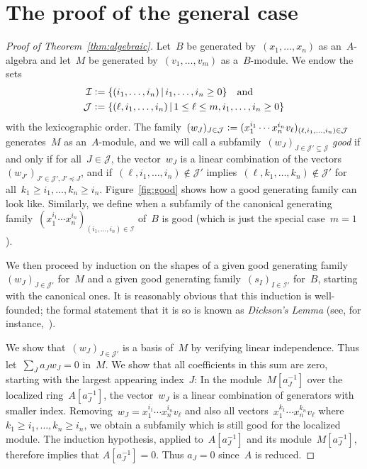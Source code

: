 \documentclass[oneside]{amsart}
\theoremstyle{definition}
\theoremstyle{plain}
\theoremstyle{remark}
\newcommand{\I}{\mathcal{I}}
\newcommand{\J}{\mathcal{J}}
\newcommand{\defeq}{\vcentcolon=}
\begin{document}
\section{The proof of the general case}

\begin{proof}[Proof of Theorem~\ref{thm:algebraic}]
Let~$B$ be generated by~$(x_1,\ldots,x_n)$ as an~$A$-algebra and
let~$M$ be generated by~$(v_1,\ldots,v_m)$ as a~$B$-module. We endow the sets
\begin{align*}
  \I &\defeq \{ (i_1,\ldots,i_n) \,|\, i_1,\ldots,i_n \geq 0 \}
  \quad\text{and} \\
  \J &\defeq \{ (\ell, i_1,\ldots,i_n) \,|\, 1 \leq \ell \leq m, i_1,\ldots,i_n \geq 0 \}
\end{align*}
with the lexicographic order. The family~$(w_J)_{J \in \J} \defeq (x_1^{i_1}
\cdots x_n^{i_n} v_\ell)_{(\ell,i_1,\ldots,i_n) \in \J}$ generates~$M$ as
an~$A$-module, and we will call a subfamily~$(w_J)_{J \in \J' \subseteq \J}$
\emph{good} if and only if for all~$J \in \J$, the vector~$w_J$ is a linear
combination of the vectors~$(w_{J'})_{J' \in \J', J' \preceq J}$,
and if~$(\ell,i_1,\ldots,i_n) \not\in \J'$ implies~$(\ell,k_1,\ldots,k_n) \not\in
\J'$ for all~$k_1 \geq i_1, \ldots, k_n \geq i_n$. Figure~\ref{fig:good} shows
how a good generating family can look like.
Similarly, we define when a subfamily of the canonical generating
family~$(x_1^{i_1} \cdots x_n^{i_n})_{(i_1,\ldots,i_n) \in \I}$ of~$B$ is good
(which is just the special case~$m = 1$).

We then proceed by induction on the
shapes of a given good generating family~$(w_J)_{J \in \J'}$ for~$M$ and a given
good generating family~$(s_I)_{I \in \I'}$ for~$B$, starting with the canonical ones. It is
reasonably obvious that this induction is well-founded; the formal statement
that it is so is known as \emph{Dickson's Lemma} (see, for
instance,~\cite[Thm.~1.1]{veldman:kruskal}).

We show that~$(w_J)_{J \in \J'}$ is a basis of~$M$ by verifying linear
independence. Thus let~$\sum_J a_J w_J = 0$ in~$M$. We show that all
coefficients in this sum are zero, starting with the largest
appearing index~$J$: In the module~$M[a_J^{-1}]$ over the localized ring~$A[a_J^{-1}]$,
the vector~$w_J$ is a linear combination of generators with
smaller index. Removing~$w_J = x_1^{i_1} \cdots x_n^{i_n} v_\ell$ and also all
vectors~$x_1^{k_1} \cdots x_n^{k_n} v_\ell$ where~$k_1 \geq i_1, \ldots,
k_n \geq i_n$, we obtain a subfamily which is still good for
the localized module. The induction hypothesis, applied
to~$A[a_J^{-1}]$ and its module~$M[a_J^{-1}]$, therefore implies that $A[a_J^{-1}] = 0$.
Thus $a_J = 0$ since~$A$ is reduced.


\end{proof}
\end{document}
